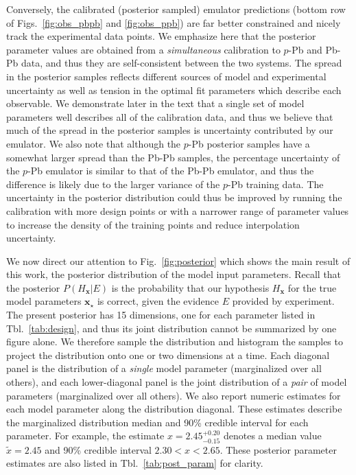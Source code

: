 \documentclass[aps,prc,reprint,amsmath,nofootinbib]{revtex4-1}
\newcommand{\x}{\mathbf x}
\begin{document}
Conversely, the calibrated (posterior sampled) emulator predictions (bottom row of Figs.~\ref{fig:obs_pbpb} and \ref{fig:obs_ppb}) are far better constrained and nicely track the experimental data points.
We emphasize here that the posterior parameter values are obtained from a \emph{simultaneous} calibration to $p$-Pb and Pb-Pb data, and thus they are self-consistent between the two systems.
The spread in the posterior samples reflects different sources of model and experimental uncertainty as well as tension in the optimal fit parameters which describe each observable.
We demonstrate later in the text that a single set of model parameters well describes all of the calibration data, and thus we believe that much of the spread in the posterior samples is uncertainty contributed by our emulator.
We also note that although the $p$-Pb posterior samples have a somewhat larger spread than the Pb-Pb samples, the percentage uncertainty of the $p$-Pb emulator is similar to that of the Pb-Pb emulator, and thus the difference is likely due to the larger variance of the $p$-Pb training data.
The uncertainty in the posterior distribution could thus be improved by running the calibration with more design points or with a narrower range of parameter values to increase the density of the training points and reduce interpolation uncertainty.

We now direct our attention to Fig.~\ref{fig:posterior} which shows the main result of this work, the posterior distribution of the model input parameters.
Recall that the posterior $P(H_\x | E)$ is the probability that our hypothesis $H_\x$ for the true model parameters $\x_\star$ is correct, given the evidence $E$ provided by experiment.
The present posterior has 15 dimensions, one for each parameter listed in Tbl.~\ref{tab:design}, and thus its joint distribution cannot be summarized by one figure alone.
We therefore sample the distribution and histogram the samples to project the distribution onto one or two dimensions at a time.
Each diagonal panel is the distribution of a \emph{single} model parameter (marginalized over all others), and each lower-diagonal panel is the joint distribution of a \emph{pair} of model parameters (marginalized over all others).
We also report numeric estimates for each model parameter along the distribution diagonal.
These estimates describe the marginalized distribution median and 90\% credible interval for each parameter.
For example, the estimate $x=2.45_{-0.15}^{+0.20}$ denotes a median value $\tilde{x}=2.45$ and 90\% credible interval $2.30 < x < 2.65$.
These posterior parameter estimates are also listed in Tbl.~\ref{tab:post_param} for clarity.
\end{document}
